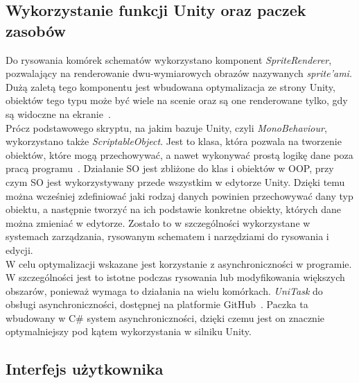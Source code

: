 \newpage %
\subsection{Wykorzystanie funkcji Unity oraz paczek zasobów}
\label{subsec:zasoby}

Do rysowania komórek schematów wykorzystano komponent \textit{SpriteRenderer},
pozwalający na renderowanie dwu-wymiarowych obrazów nazywanych \textit{sprite'ami}.
Dużą zaletą tego komponentu jest wbudowana optymalizacja ze strony Unity,
obiektów tego typu może być wiele na scenie oraz są one renderowane tylko,
gdy są widoczne na ekranie~\cite{unity_csharp, unity_docs}. \\
\indent Prócz podstawowego skryptu, na jakim bazuje Unity, czyli \textit{MonoBehaviour},
wykorzystano także \textit{ScriptableObject}.
Jest to klasa, która pozwala na tworzenie obiektów, które mogą przechowywać,
a nawet wykonywać prostą logikę dane poza pracą programu~\cite{unity_csharp, unity_docs}.
Działanie SO jest zbliżone do klas i obiektów w OOP,
przy czym SO jest wykorzystywany przede wszystkim w edytorze Unity.
Dzięki temu można wcześniej zdefiniować jaki rodzaj danych powinien przechowywać dany typ obiektu,
a następnie tworzyć na ich podstawie konkretne obiekty, których dane można zmieniać w edytorze.
Zostało to w szczególności wykorzystane w systemach zarządzania, rysowanym schematem
i narzędziami do rysowania i edycji.\\
\indent W celu optymalizacji wskazane jest korzystanie z asynchroniczności w programie.
W szczególności jest to istotne podczas rysowania lub modyfikowania większych obszarów,
ponieważ wymaga to działania na wielu komórkach.
\textit{UniTask} do obsługi asynchroniczności,
dostępnej na platformie GitHub~\cite{unitask}.
Paczka ta wbudowany w C\# system asynchroniczności,
dzięki czemu jest on znacznie optymalniejszy pod kątem wykorzystania w silniku Unity.


\subsection{Interfejs użytkownika}
\label{subsec:interfejs_uzytkownika}

